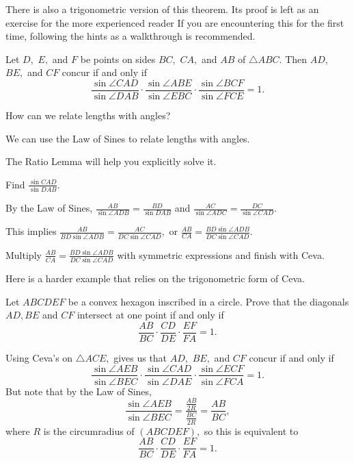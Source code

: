 There is also a trigonometric version of this theorem. Its proof is left as an exercise for the more experienced reader If you are encountering this for the first time, following the hints as a walkthrough is recommended.
\begin{theo}
Let $D,$ $E,$ and $F$ be points on sides $BC,$ $CA,$ and $AB$ of $\triangle ABC.$ Then $AD,$ $BE,$ and $CF$ concur if and only if
\[\frac{\sin\angle CAD}{\sin\angle DAB}\cdot \frac{\sin\angle ABE}{\sin\angle EBC}\cdot \frac{\sin\angle BCF}{\sin\angle FCE}=1.\]
\begin{hint}
\begin{addhint}
{How can we relate lengths with angles?}
\end{addhint}
\begin{addhint}
{We can use the Law of Sines to relate lengths with angles.}
\end{addhint}
\begin{addhint}
{The Ratio Lemma will help you explicitly solve it.}
\end{addhint}
\begin{addhint}
{Find $\frac{\sin CAD}{\sin DAB}.$}
\end{addhint}
\begin{addhint}
{By the Law of Sines, $\frac{AB}{\sin \angle ADB}=\frac{BD}{\sin DAB}$ and $\frac{AC}{\sin \angle ADC}=\frac{DC}{\sin \angle CAD}.$}
\end{addhint}
\begin{addhint}
{This implies $\frac{AB}{BD \sin \angle ADB}=\frac{AC}{DC\sin \angle CAD},$ or $\frac{AB}{CA}=\frac{BD\sin \angle ADB}{DC\sin \angle CAD}.$}
\end{addhint}
\begin{addhint}
{Multiply $\frac{AB}{CA}=\frac{BD\sin \angle ADB}{DC\sin \angle CAD}$ with symmetric expressions and finish with Ceva.}
\end{addhint}
\end{hint}
\end{theo}

Here is a harder example that relies on the trigonometric form of Ceva.

\begin{exam}
Let $ABCDEF$ be a convex hexagon inscribed in a circle. Prove that the diagonals $AD, BE$ and $CF$ intersect at one point if and only if \[\frac{AB}{BC} \cdot \frac{CD}{DE}\cdot \frac{EF}{FA}=1.\]
\end{exam}

\begin{sol}
Using Ceva's on $\triangle ACE,$ gives us that $AD,$ $BE,$ and $CF$ concur if and only if
\[\frac{\sin\angle AEB}{\sin\angle BEC}\cdot \frac{\sin\angle CAD}{\sin\angle DAE}\cdot \frac{\sin\angle ECF}{\sin\angle FCA}=1.\]
But note that by the Law of Sines,
\[\frac{\sin\angle AEB}{\sin\angle BEC}=\frac{\frac{AB}{2R}}{\frac{BC}{2R}}=\frac{AB}{BC},\]
where $R$ is the circumradius of $(ABCDEF),$ so this is equivalent to
\[\frac{AB}{BC}\cdot \frac{CD}{DE}\cdot \frac{EF}{FA} =1.\]
\end{sol}

